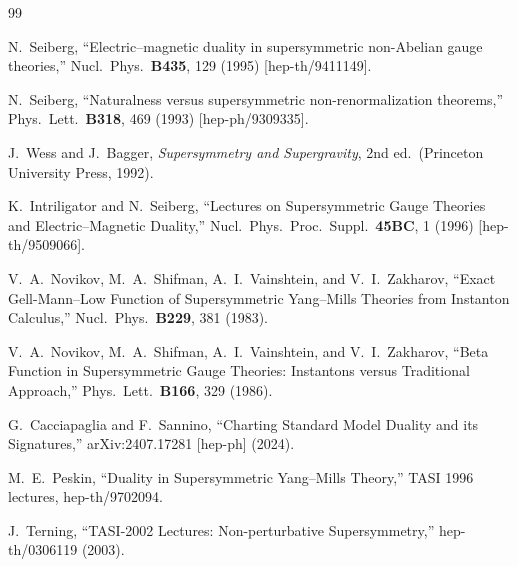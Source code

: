 \documentclass[11pt,a4paper]{article}
\begin{document}
\newpage
\begin{thebibliography}{99}

  N.~Seiberg,
  ``Electric--magnetic duality in supersymmetric non-Abelian gauge theories,''
  Nucl.\ Phys.\ \textbf{B435}, 129 (1995)
  [hep-th/9411149].

  N.~Seiberg,
  ``Naturalness versus supersymmetric non-renormalization theorems,''
  Phys.\ Lett.\ \textbf{B318}, 469 (1993)
  [hep-ph/9309335].

  J.~Wess and J.~Bagger,
  \textit{Supersymmetry and Supergravity},
  2nd ed.\ (Princeton University Press, 1992).

  K.~Intriligator and N.~Seiberg,
  ``Lectures on Supersymmetric Gauge Theories and Electric--Magnetic
  Duality,''
  Nucl.\ Phys.\ Proc.\ Suppl.\ \textbf{45BC}, 1 (1996)
  [hep-th/9509066].

  V.~A.~Novikov, M.~A.~Shifman, A.~I.~Vainshtein, and V.~I.~Zakharov,
  ``Exact Gell-Mann--Low Function of Supersymmetric Yang--Mills Theories
  from Instanton Calculus,''
  Nucl.\ Phys.\ \textbf{B229}, 381 (1983).

  V.~A.~Novikov, M.~A.~Shifman, A.~I.~Vainshtein, and V.~I.~Zakharov,
  ``Beta Function in Supersymmetric Gauge Theories: Instantons versus
  Traditional Approach,''
  Phys.\ Lett.\ \textbf{B166}, 329 (1986).

  G.~Cacciapaglia and F.~Sannino,
  ``Charting Standard Model Duality and its Signatures,''
  arXiv:2407.17281 [hep-ph] (2024).

  M.~E.~Peskin,
  ``Duality in Supersymmetric Yang--Mills Theory,''
  TASI 1996 lectures,
  hep-th/9702094.

  J.~Terning,
  ``TASI-2002 Lectures: Non-perturbative Supersymmetry,''
  hep-th/0306119 (2003).

\end{thebibliography}
\end{document}
